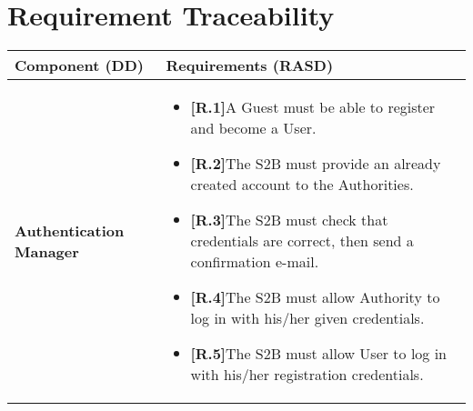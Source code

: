 \section{Requirement Traceability}

\begin{table}[H]
\advance\leftskip-1.5cm
\begin{tabular}{|l|p{}|}
\hline
\textbf{\textbf{Component (DD)}}             &    \textbf{Requirements (RASD)}                                                           \\ \hline

\textbf{Authentication Manager}    & \begin{itemize}
    \item \textbf{[R.1]}A Guest must be able to register and \newline become a User.
    
    \item \textbf{[R.2]}The S2B must provide an already created account to the Authorities.

    \item \textbf{[R.3]}The S2B must check that credentials \newline are correct, then send a confirmation e-mail.
    \item \textbf{[R.4]}The S2B must allow Authority to log \newline in with his/her given credentials.
    \item \textbf{[R.5]}The S2B must allow User to log in with \newline his/her registration credentials.
\end{itemize}  \\ \hline









\end{tabular}
\end{table}

